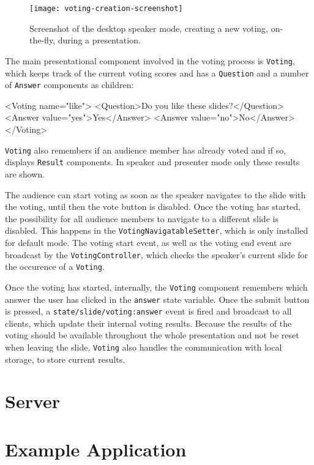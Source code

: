 \begin{figure}
\centering
\texttt{[image: voting-creation-screenshot]}
\caption{Screenshot of the desktop speaker mode, creating a new voting, on-the-fly, during a presentation.}
\label{fig:implementation-interactive-voting}
\end{figure}

The main presentational component involved in the voting process is \texttt{Voting}, which keeps track of the current voting scores and has a \texttt{Question} and a number of \texttt{Answer} components as children:
\begin{JsCode}
<Voting name="like">
  <Question>Do you like these slides?</Question>
  <Answer value="yes">Yes</Answer>
  <Answer value="no">No</Answer>
</Voting>
\end{JsCode}
%
\texttt{Voting} also remembers if an audience member has already voted and if so, displays \texttt{Result} components. In speaker and presenter mode only these results are shown.

The audience can start voting as soon as the speaker navigates to the slide with the voting, until then the vote button is disabled. Once the voting has started, the possibility for all audience members to navigate to a different slide is disabled. This happens in the \texttt{VotingNavigatableSetter}, which is only installed for default mode. The voting start event, as well as the voting end event are broadcast by the \texttt{VotingController}, which checks the speaker's current slide for the occurence of a \texttt{Voting}.

Once the voting has started, internally, the \texttt{Voting} component remembers which answer the user has clicked in the \texttt{answer} state variable. Once the submit button is pressed, a \texttt{state/slide/voting:answer} event is fired and broadcast to all clients, which update their internal voting results.
Because the results of the voting should be available throughout the whole presentation and not be reset when leaving the slide, \texttt{Voting} also handles the communication with local storage, to store current results.

\section{Server}
\label{sec:implementation-server}

\section{Example Application}
\label{sec:implementation-client}
